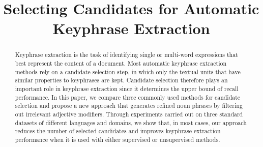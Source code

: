 \documentclass[11pt]{article}
\title{Selecting Candidates for Automatic Keyphrase Extraction}
\date{}
\begin{document}
  \maketitle
  \begin{abstract}
    Keyphrase extraction is the task of identifying single or multi-word
    expressions that best represent the content of a document. Most automatic
    keyphrase extraction methods rely on a candidate selection step, in which
    only the textual units that have similar properties to keyphrases are kept.
    Candidate selection therefore plays an important role in keyphrase
    extraction since it determines the upper bound of recall performance. In
    this paper, we compare three commonly used methods for candidate selection
    and propose a new approach that generates refined noun phrases by filtering
    out irrelevant adjective modifiers. Through experiments carried out on three
    standard datasets of different languages and domains, we show that, in most
    cases, our approach reduces the number of selected candidates and improves
    keyphrase extraction performance when it is used with either supervised or
    unsupervised methods.
  \end{abstract}

  


  
  
\end{document}
